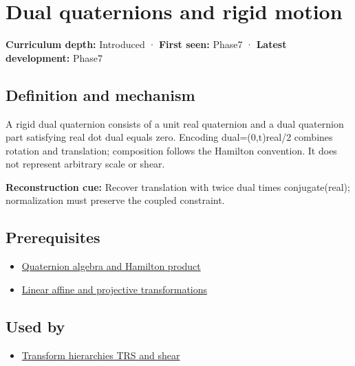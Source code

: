 \hypertarget{appendix-d1ea57347893}{}\label{referencestart:appendix-d1ea57347893}
\section{Dual quaternions and rigid motion}\label{appendix-d1ea57347893-dual-quaternions-and-rigid-motion}

\textbf{Curriculum depth:} Introduced · \textbf{First seen:} Phase7 · \textbf{Latest development:} Phase7

\begin{allmightroledefinition}

\subsection{Definition and mechanism}\label{appendix-d1ea57347893-definition-and-mechanism}

A rigid dual quaternion consists of a unit real quaternion and a dual quaternion part satisfying real dot dual equals zero. Encoding dual=(0,t)real/2 combines rotation and translation; composition follows the Hamilton convention. It does not represent arbitrary scale or shear.

\end{allmightroledefinition}

\textbf{Reconstruction cue:} Recover translation with twice dual times conjugate(real); normalization must preserve the coupled constraint.

\subsection{Prerequisites}\label{appendix-d1ea57347893-prerequisites}

\begin{itemize}
\tightlist
\item
  \hyperref[appendix-965d9260eeab]{Quaternion algebra and Hamilton product}
\item
  \hyperref[appendix-0bf0ca73f735]{Linear affine and projective transformations}
\end{itemize}

\subsection{Used by}\label{appendix-d1ea57347893-used-by}

\begin{itemize}
\tightlist
\item
  \hyperref[appendix-292c061cd47c]{Transform hierarchies TRS and shear}
\end{itemize}

